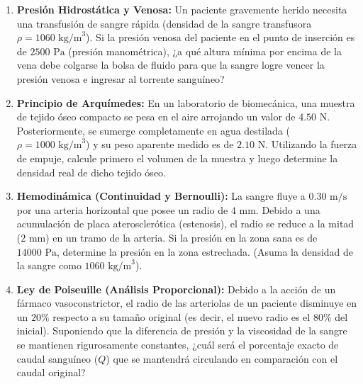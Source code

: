 \documentclass[11pt,letterpaper]{article}
\begin{document}
\begin{enumerate}

    \item \textbf{Presión Hidrostática y Venosa:} Un paciente gravemente herido necesita una transfusión de sangre rápida (densidad de la sangre transfusora $\rho = 1060 \text{ kg/m}^3$). Si la presión venosa del paciente en el punto de inserción es de $2500 \text{ Pa}$ (presión manométrica), ¿a qué altura mínima por encima de la vena debe colgarse la bolsa de fluido para que la sangre logre vencer la presión venosa e ingresar al torrente sanguíneo?
    \vspace{0.8cm}

    \item \textbf{Principio de Arquímedes:} En un laboratorio de biomecánica, una muestra de tejido óseo compacto se pesa en el aire arrojando un valor de $4.50 \text{ N}$. Posteriormente, se sumerge completamente en agua destilada ($\rho = 1000 \text{ kg/m}^3$) y su peso aparente medido es de $2.10 \text{ N}$. Utilizando la fuerza de empuje, calcule primero el volumen de la muestra y luego determine la densidad real de dicho tejido óseo.
    \vspace{0.8cm}
    
    \item \textbf{Hemodinámica (Continuidad y Bernoulli):} La sangre fluye a $0.30 \text{ m/s}$ por una arteria horizontal que posee un radio de $4 \text{ mm}$. Debido a una acumulación de placa aterosclerótica (estenosis), el radio se reduce a la mitad ($2 \text{ mm}$) en un tramo de la arteria. Si la presión en la zona sana es de $14000 \text{ Pa}$, determine la presión en la zona estrechada. (Asuma la densidad de la sangre como $1060 \text{ kg/m}^3$).
    \vspace{0.8cm}
    
    \item \textbf{Ley de Poiseuille (Análisis Proporcional):} Debido a la acción de un fármaco vasoconstrictor, el radio de las arteriolas de un paciente disminuye en un $20\%$ respecto a su tamaño original (es decir, el nuevo radio es el $80\%$ del inicial). Suponiendo que la diferencia de presión y la viscosidad de la sangre se mantienen rigurosamente constantes, ¿cuál será el porcentaje exacto de caudal sanguíneo ($Q$) que se mantendrá circulando en comparación con el caudal original?
    \vspace{0.8cm}


\end{enumerate}
\end{document}

